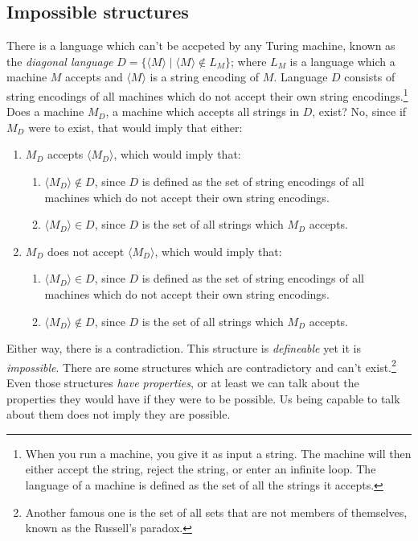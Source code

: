 \newpage

\subsection{Impossible structures}

There is a language which can't be accpeted by any Turing machine, known as the \textit{diagonal language} $D = \{\langle M \rangle \mid \langle M \rangle \notin L_M \}$; where $L_M$ is a language which a machine $M$ accepts and $\langle M \rangle$ is a string encoding of $M$.
Language $D$ consists of string encodings of all machines which do not accept their own string encodings.\footnote
{
When you run a machine, you give it as input a string.
The machine will then either accept the string, reject the string, or enter an infinite loop.
The language of a machine is defined as the set of all the strings it accepts.
}
Does a machine $M_D$, a machine which accepts all strings in $D$, exist?
No, since if $M_D$ were to exist, that would imply that either:
\begin{enumerate}
\item $M_D$ accepts $\langle M_D \rangle$, which would imply that:
\begin{enumerate}
\item $\langle M_D \rangle \notin D$, since $D$ is defined as the set of string encodings of all machines which do not accept their own string encodings.
\item $\langle M_D \rangle \in D$, since $D$ is the set of all strings which $M_D$ accepts.
\end{enumerate}
\item $M_D$ does not accept $\langle M_D \rangle$, which would imply that:
\begin{enumerate}
\item $\langle M_D \rangle \in D$, since $D$ is defined as the set of string encodings of all machines which do not accept their own string encodings.
\item $\langle M_D \rangle \notin D$, since $D$ is the set of all strings which $M_D$ accepts.
\end{enumerate}
\end{enumerate}
Either way, there is a contradiction. This structure is \textit{defineable} yet it is \textit{impossible}.
There are some structures which are contradictory and can't exist.\footnote{Another famous one is the set of all sets that are not members of themselves, known as the Russell's paradox.}
Even those structures \textit{have properties}, or at least we can talk about the properties they would have if they were to be possible.
Us being capable to talk about them does not imply they are possible.

